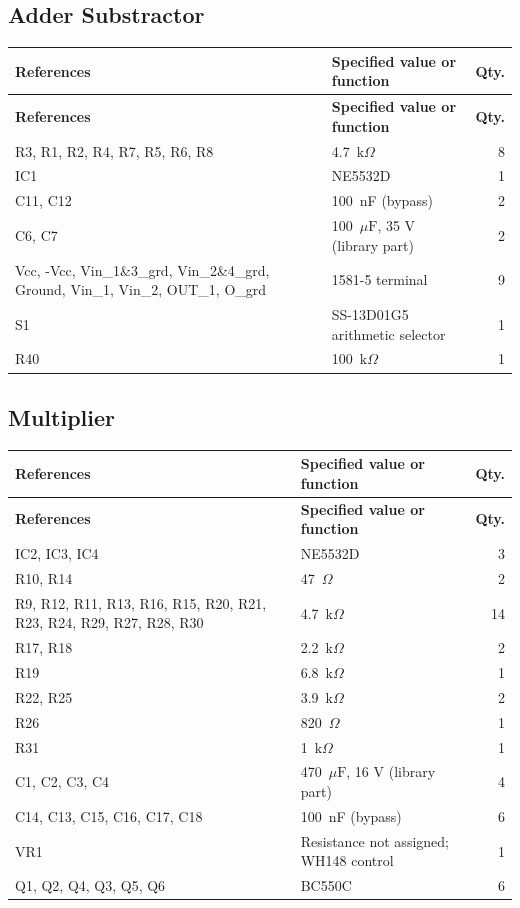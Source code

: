 \documentclass[11pt,a4paper]{article}
\renewcommand{\arraystretch}{1.15}
\newcommand{\ohm}{\ensuremath{\Omega}}
\newcommand{\kohm}{\ensuremath{\mathrm{k}\Omega}}
\newcommand{\uF}{\ensuremath{\mu\mathrm{F}}}
\begin{document}
\subsection{Adder Substractor}
\begingroup
\small
\renewcommand{\arraystretch}{1.08}
\begin{longtable}{P{0.30\textwidth}P{0.52\textwidth}r}
\toprule\textbf{References} & \textbf{Specified value or function} & \textbf{Qty.}\\\midrule\endfirsthead
\toprule\textbf{References} & \textbf{Specified value or function} & \textbf{Qty.}\\\midrule\endhead
R3, R1, R2, R4, R7, R5, R6, R8 & 4.7~\kohm & 8\\
IC1 & NE5532D & 1\\
C11, C12 & 100~nF (bypass) & 2\\
C6, C7 & 100~\uF, 35 V (library part) & 2\\
Vcc, -Vcc, Vin\_1\&3\_grd, Vin\_2\&4\_grd, Ground, Vin\_1, Vin\_2, OUT\_1, O\_grd & 1581-5 terminal & 9\\
S1 & SS-13D01G5 arithmetic selector & 1\\
R40 & 100~\kohm & 1\\
\bottomrule
\end{longtable}
\endgroup
{}
\subsection{Multiplier}
\begingroup
\small
\renewcommand{\arraystretch}{1.08}
\begin{longtable}{P{0.30\textwidth}P{0.52\textwidth}r}
\toprule\textbf{References} & \textbf{Specified value or function} & \textbf{Qty.}\\\midrule\endfirsthead
\toprule\textbf{References} & \textbf{Specified value or function} & \textbf{Qty.}\\\midrule\endhead
IC2, IC3, IC4 & NE5532D & 3\\
R10, R14 & 47~\ohm & 2\\
R9, R12, R11, R13, R16, R15, R20, R21, R23, R24, R29, R27, R28, R30 & 4.7~\kohm & 14\\
R17, R18 & 2.2~\kohm & 2\\
R19 & 6.8~\kohm & 1\\
R22, R25 & 3.9~\kohm & 2\\
R26 & 820~\ohm & 1\\
R31 & 1~\kohm & 1\\
C1, C2, C3, C4 & 470~\uF, 16 V (library part) & 4\\
C14, C13, C15, C16, C17, C18 & 100~nF (bypass) & 6\\
VR1 & Resistance not assigned; WH148 control & 1\\
Q1, Q2, Q4, Q3, Q5, Q6 & BC550C & 6\\
\bottomrule
\end{longtable}
\endgroup
{}
\end{document}
